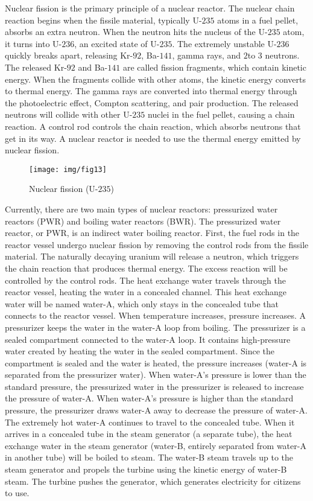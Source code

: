 \documentclass{article}
\begin{document}
Nuclear fission is the primary principle of a nuclear reactor. The nuclear chain reaction begins when the fissile material, typically U-$235$ atoms in a fuel pellet, absorbs an extra neutron. When the neutron hits the nucleus of the U-$235$ atom, it turns into U-$236$, an excited state of U-$235$. The extremely unstable U-$236$ quickly breaks apart, releasing Kr-$92$, Ba-$141$, gamma rays, and $2$to $3$ neutrons. The released Kr-$92$ and Ba-$141$ are called fission fragments, which contain kinetic energy. When the fragments collide with other atoms, the kinetic energy converts to thermal energy. The gamma rays are converted into thermal energy through the photoelectric effect, Compton scattering, and pair production. The released neutrons will collide with other U-$235$ nuclei in the fuel pellet, causing a chain reaction. A control rod controls the chain reaction, which absorbs neutrons that get in its way. A nuclear reactor is needed to use the thermal energy emitted by nuclear fission. 
\begin{figure}[htbp]
    \center
    \texttt{[image: img/fig13]}
    \caption{Nuclear fission (U-$235$)}
\end{figure}
Currently, there are two main types of nuclear reactors: pressurized water reactors (PWR) and boiling water reactors (BWR). 
The pressurized water reactor, or PWR, is an indirect water boiling reactor. First, the fuel rods in the reactor vessel undergo nuclear fission by removing the control rods from the fissile material. The naturally decaying uranium will release a neutron, which triggers the chain reaction that produces thermal energy. The excess reaction will be controlled by the control rods. The heat exchange water travels through the reactor vessel, heating the water in a concealed channel. This heat exchange water will be named water-A, which only stays in the concealed tube that connects to the reactor vessel. When temperature increases, pressure increases. A pressurizer keeps the water in the water-A loop from boiling. The pressurizer is a sealed compartment connected to the water-A loop. It contains high-pressure water created by heating the water in the sealed compartment. Since the compartment is sealed and the water is heated, the pressure increases (water-A is separated from the pressurizer water). When water-A’s pressure is lower than the standard pressure, the pressurized water in the pressurizer is released to increase the pressure of water-A. When water-A’s pressure is higher than the standard pressure, the pressurizer draws water-A away to decrease the pressure of water-A. The extremely hot water-A continues to travel to the concealed tube. When it arrives in a concealed tube in the steam generator (a separate tube), the heat exchange water in the steam generator (water-B, entirely separated from water-A in another tube) will be boiled to steam. The water-B steam travels up to the steam generator and propels the turbine using the kinetic energy of water-B steam. The turbine pushes the generator, which generates electricity for citizens to use. 
\end{document}
